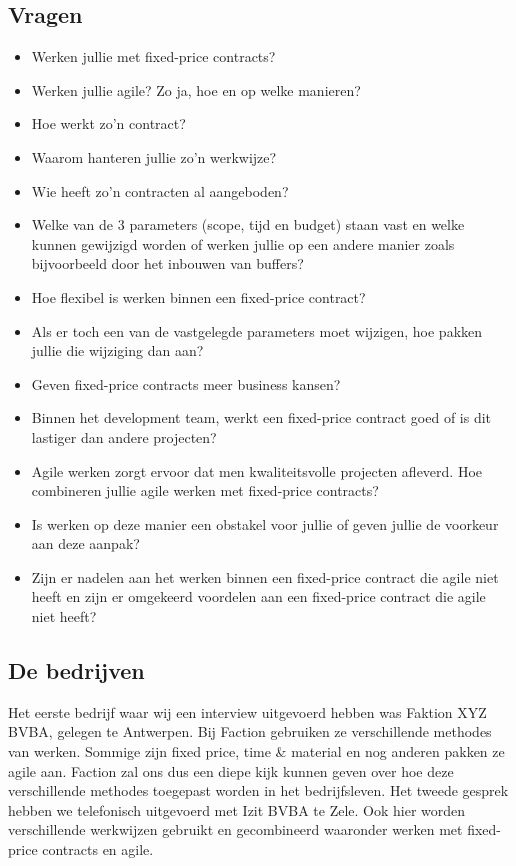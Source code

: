 \documentclass{hogent-article}
\begin{document}
	\subsection{Vragen}
	\begin{itemize}
		\item Werken jullie met fixed-price contracts?
		\item Werken jullie agile? Zo ja, hoe en op welke manieren?
		\item Hoe werkt zo'n contract?
		\item Waarom hanteren jullie zo’n werkwijze?
		\item Wie heeft zo'n contracten al aangeboden?
		\item Welke van de 3 parameters (scope, tijd en budget) staan vast en welke kunnen gewijzigd worden of werken jullie op een andere manier zoals bijvoorbeeld door het inbouwen van buffers?
		\item Hoe flexibel is werken binnen een fixed-price contract?
		\item Als er toch een van de vastgelegde parameters moet wijzigen, hoe pakken jullie die wijziging dan aan?
		\item Geven fixed-price contracts meer business kansen?
		\item Binnen het development team, werkt een fixed-price contract goed of is dit lastiger dan andere projecten?
		\item Agile werken zorgt ervoor dat men kwaliteitsvolle projecten afleverd. Hoe combineren jullie agile werken met fixed-price contracts?
		\item Is werken op deze manier een obstakel voor jullie of geven jullie de voorkeur aan deze aanpak?
		\item Zijn er nadelen aan het werken binnen een fixed-price contract die agile niet heeft en zijn er omgekeerd voordelen aan een fixed-price contract die agile niet heeft?
	\end{itemize}
		
    \subsection{De bedrijven}
    Het eerste bedrijf waar wij een interview uitgevoerd hebben was Faktion XYZ BVBA, gelegen te Antwerpen. Bij Faction gebruiken ze verschillende methodes van werken. Sommige zijn fixed price, time \& material en nog anderen pakken ze agile aan. Faction zal ons dus een diepe kijk kunnen geven over hoe deze verschillende methodes toegepast worden in het bedrijfsleven.
    \linebreak
    \linebreak
    Het tweede gesprek hebben we telefonisch uitgevoerd met Izit BVBA te Zele. Ook hier worden verschillende werkwijzen gebruikt en gecombineerd waaronder werken met fixed-price contracts en agile.
    
\end{document}
